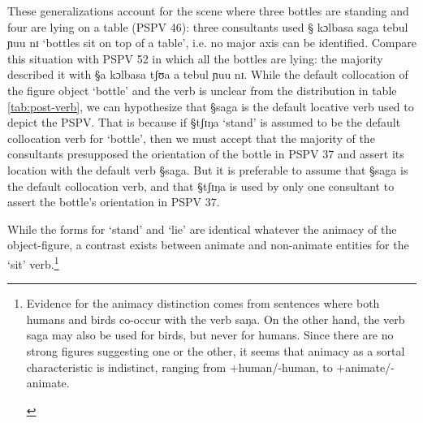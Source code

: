 These generalizations account for the scene where three bottles
are standing and four are lying on a table (PSPV 46): three consultants used {\S
kɔlbasa saga tebul ɲuu nɪ} `bottles sit on top of a table', i.e. no major axis
can be identified.  Compare this situation with PSPV 52 in which all the bottles
are lying: the majority described it with {\S a kɔlbasa tʃʊa a tebul ɲuu nɪ}.
While the default collocation of  the figure object  `bottle' and the verb is
unclear from the distribution in table  \ref{tab:post-verb}, we can hypothesize
that {\S saga} is  the default locative verb used to depict the PSPV. That is
because if   {\S tʃɪŋa} `stand' is assumed to be the default collocation verb
for `bottle', then we must accept that the majority  of the consultants
presupposed the orientation of the bottle in PSPV 37 and  assert its location
with the default verb {\S saga}. But it is preferable to assume that {\S saga}
is the default collocation verb, and that  {\S tʃɪŋa} is used by only one
consultant to assert the bottle's orientation in PSPV 37.  

While the  forms for `stand' and `lie' are identical whatever the animacy of
the object-figure, a contrast exists between animate and non-animate entities
for 
the `sit' verb.\footnote{Evidence for the animacy distinction
comes from sentences where both humans and birds co-occur with the verb {\F
saŋa}. On the other hand,  the verb {\F saga} may also be used for birds, but
never for humans. Since there are no strong figures suggesting one or the other,
it seems that animacy as a sortal characteristic is indistinct, ranging from 
+human/-human, to +animate/-animate. 

\begin{exe}
\end{exe} 

\begin{exe}
\end{exe} 
}


